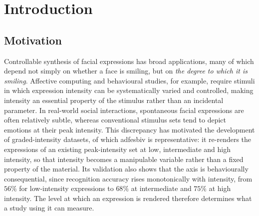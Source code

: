 \chapter{Introduction}\label{cap:introduction}
\glsresetall

%
%

\section{Motivation}\label{sec:motivation}

Controllable synthesis of facial expressions has broad applications, many of which depend not simply
on whether a face is smiling, but on \emph{the degree to which it is smiling}. Affective computing and
behavioural studies, for example, require stimuli in which expression intensity can be systematically
varied and controlled, making intensity an essential property of the stimulus rather than an incidental parameter.
In real-world social interactions, spontaneous facial expressions are often relatively subtle,
whereas conventional stimulus sets tend to depict emotions at their peak intensity. This discrepancy
has motivated the development of graded-intensity datasets, of which \gls{adfesbiv}
\citep{wingenbach2016adfesbiv} is representative: it re-renders the expressions of an existing
peak-intensity set at low, intermediate and high intensity, so that intensity becomes a
manipulable variable rather than a fixed property of the material. Its validation also shows that
the axis is behaviourally consequential, since recognition accuracy rises monotonically with
intensity, from $56\%$ for low-intensity expressions to $68\%$ at intermediate and $75\%$ at high
intensity. The level at which an expression is rendered therefore determines what a study
using it can measure.


